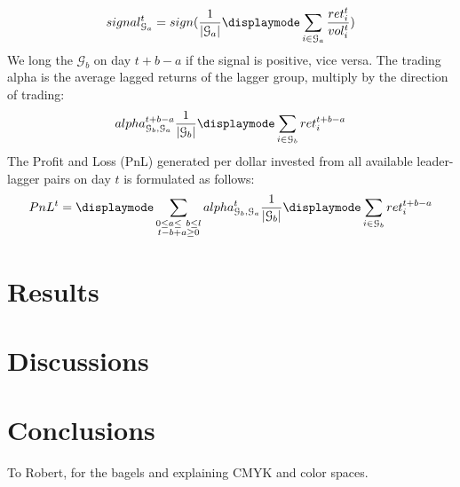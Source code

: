 \documentclass[sigconf]{acmart}
\begin{document}
$$signal^t_{\mathcal{G}_a} = sign(\frac{1}{|\mathcal{G}_a|}\displaymode\sum_{i \in\mathcal{G}_a}\frac{ret^t_i}{vol^t_i})$$
We long the $\mathcal{G}_b$ on day $t+b-a$ if the signal is positive, vice versa.
The trading alpha is the average lagged returns of the lagger group, multiply by the direction of trading:
$$alpha^{t+b-a}_{\mathcal{G}_b,\mathcal{G}_a} \frac{1}{|\mathcal{G}_b|}\displaymode\sum_{i \in\mathcal{G}_b}ret^{t+b-a}_i$$ 
The Profit and Loss (PnL) generated per dollar invested from all available leader-lagger pairs on day $t$ is formulated as follows:
\begin{equation}
    PnL^t = \displaymode \sum_{\substack{0\leq a\leq\ b\leq l\\t-b+a\geq0}} alpha^{t}_{\mathcal{G}_b,\mathcal{G}_a} \frac{1}{|\mathcal{G}_b|}\displaymode\sum_{i \in\mathcal{G}_b}ret^{t+b-a}_i
\end{equation}

\section{Results}
\section{Discussions}
\section{Conclusions}



\begin{acks}
To Robert, for the bagels and explaining CMYK and color spaces.
\end{acks}



\end{document}
